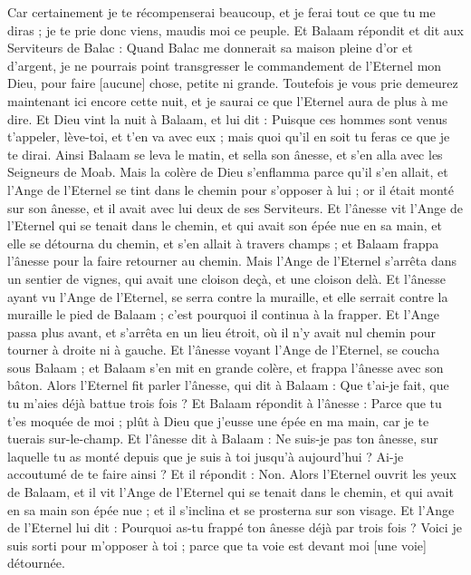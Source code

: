 \begin{multicols}{2}
Car certainement je te récompenserai beaucoup, et je ferai tout ce que tu me diras ; je te prie donc viens, maudis moi ce peuple.
Et Balaam répondit et dit aux Serviteurs de Balac : Quand Balac me donnerait sa maison pleine d'or et d'argent, je ne pourrais point transgresser le commandement de l'Eternel mon Dieu, pour faire [aucune] chose, petite ni grande.
Toutefois je vous prie demeurez maintenant ici encore cette nuit, et je saurai ce que l'Eternel aura de plus à me dire.
Et Dieu vint la nuit à Balaam, et lui dit : Puisque ces hommes sont venus t'appeler, lève-toi, et t'en va avec eux ; mais quoi qu'il en soit tu feras ce que je te dirai.
Ainsi Balaam se leva le matin, et sella son ânesse, et s'en alla avec les Seigneurs de Moab.
Mais la colère de Dieu s'enflamma parce qu'il s'en allait, et l'Ange de l'Eternel se tint dans le chemin pour s'opposer à lui ; or il était monté sur son ânesse, et il avait avec lui deux de ses Serviteurs.
Et l'ânesse vit l'Ange de l'Eternel qui se tenait dans le chemin, et qui avait son épée nue en sa main, et elle se détourna du chemin, et s'en allait à travers champs ; et Balaam frappa l'ânesse pour la faire retourner au chemin.
Mais l'Ange de l'Eternel s'arrêta dans un sentier de vignes, qui avait une cloison deçà, et une cloison delà.
Et l'ânesse ayant vu l'Ange de l'Eternel, se serra contre la muraille, et elle serrait contre la muraille le pied de Balaam ; c'est pourquoi il continua à la frapper.
Et l'Ange passa plus avant, et s'arrêta en un lieu étroit, où il n'y avait nul chemin pour tourner à droite ni à gauche.
Et l'ânesse voyant l'Ange de l'Eternel, se coucha sous Balaam ; et Balaam s'en mit en grande colère, et frappa l'ânesse avec son bâton.
Alors l'Eternel fit parler l'ânesse, qui dit à Balaam : Que t'ai-je fait, que tu m'aies déjà battue trois fois ?
Et Balaam répondit à l'ânesse : Parce que tu t'es moquée de moi ; plût à Dieu que j'eusse une épée en ma main, car je te tuerais sur-le-champ.
Et l'ânesse dit à Balaam : Ne suis-je pas ton ânesse, sur laquelle tu as monté depuis que je suis à toi jusqu'à aujourd'hui ? Ai-je accoutumé de te faire ainsi ? Et il répondit : Non.
Alors l'Eternel ouvrit les yeux de Balaam, et il vit l'Ange de l'Eternel qui se tenait dans le chemin, et qui avait en sa main son épée nue ; et il s'inclina et se prosterna sur son visage.
Et l'Ange de l'Eternel lui dit : Pourquoi as-tu frappé ton ânesse déjà par trois fois ? Voici je suis sorti pour m'opposer à toi ; parce que ta voie est devant moi [une voie] détournée.

\end{multicols}
